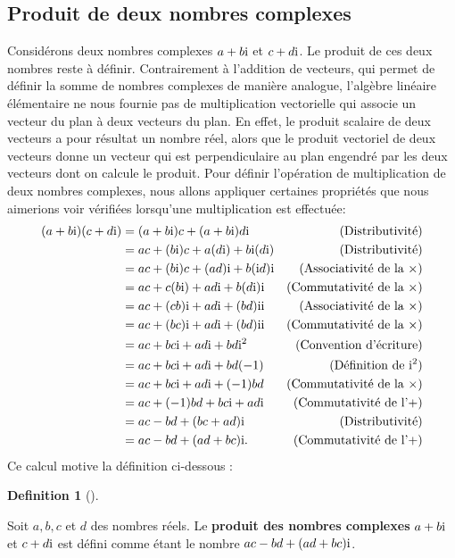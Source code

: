 \documentclass[
  letterpaper,
  DIV=11,
  numbers=noendperiod,
  oneside]{scrreprt}
\theoremstyle{definition}
\newtheorem{definition}{Definition}[chapter]
\theoremstyle{remark}
\begin{document}
\hypertarget{produit-de-deux-nombres-complexes}{%
\subsection{Produit de deux nombres
complexes}\label{produit-de-deux-nombres-complexes}}

Considérons deux nombres complexes \(a+b\textrm{i}\) et \(c+d\textrm{i}\). Le produit
de ces deux nombres reste à définir. Contrairement à l'addition de
vecteurs, qui permet de définir la somme de nombres complexes de manière
analogue, l'algèbre linéaire élémentaire ne nous fournie pas de
multiplication vectorielle qui associe un vecteur du plan à deux
vecteurs du plan. En effet, le produit scalaire de deux vecteurs a pour
résultat un nombre réel, alors que le produit vectoriel de deux vecteurs
donne un vecteur qui est perpendiculaire au plan engendré par les deux
vecteurs dont on calcule le produit. Pour définir l'opération de
multiplication de deux nombres complexes, nous allons appliquer
certaines propriétés que nous aimerions voir vérifiées lorsqu'une
multiplication est effectuée: \begin{align*}
 (a+b\textrm{i})(c+d\textrm{i})&=(a+b\textrm{i})c+(a+b\textrm{i})d\textrm{i}&\text{(Distributivité)}\\
 &=ac+(b\textrm{i})c+a(d\textrm{i})+b\textrm{i}(d\textrm{i})&\text{(Distributivité)}\\
 &=ac+(b\textrm{i})c+(ad)\textrm{i}+b(\textrm{i} d)\textrm{i}&\text{(Associativité de la $\times$)}\\
 &=ac+c(b\textrm{i})+ad\textrm{i}+b(d\textrm{i})\textrm{i}&\text{(Commutativité de la $\times$)}\\
  &=ac+(cb)\textrm{i}+ad\textrm{i}+(bd)\textrm{i}\textrm{i}&\text{(Associativité de la $\times$)}\\
 &=ac+(bc)\textrm{i}+ad\textrm{i}+(bd)\textrm{i}\textrm{i}&\text{(Commutativité de la $\times$)}\\
 &=ac+bc\textrm{i}+ad\textrm{i}+bd\textrm{i}^2&\text{(Convention d'écriture)}\\
 &=ac+bc\textrm{i}+ad\textrm{i}+bd(-1)&\text{(Définition de $\textrm{i}^2$)}\\
 &=ac+bc\textrm{i}+ad\textrm{i}+(-1)bd&\text{(Commutativité de la $\times$)}\\
 &=ac+(-1)bd+bc\textrm{i}+ad\textrm{i}&\text{(Commutativité de l'$+$)}\\
 &=ac-bd+(bc+ad)\textrm{i}&\text{(Distributivité)}\\
 &=ac-bd+(ad+bc)\textrm{i}.&\text{(Commutativité de l'$+$)}
 \end{align*} Ce calcul motive la définition ci-dessous :

\begin{definition}[]\protect\hypertarget{def-produit}{}\label{def-produit}

Soit \(a,b,c\) et \(d\) des nombres réels. Le \textbf{produit des
nombres complexes} \(a+b\textrm{i}\) et \(c+d\textrm{i}\) est défini comme étant le
nombre \(ac-bd +(ad+bc)\textrm{i}\).

\end{definition}
\end{document}

